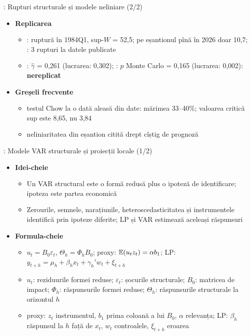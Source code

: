 \begin{frame}{: Rupturi structurale și modele neliniare (2/2)}
\itemsize{\small}
\begin{itemize}
    \item \textbf{Replicarea}
    \begin{itemize}
        \item {}: ruptură în 1984Q1, sup-$W$ = 52{,}5; pe eșantionul pînă în 2026 doar 10{,}7; : 3 rupturi la datele publicate
        \item {}: $\hat\gamma$ = 0{,}261 (lucrarea: 0{,}302); : $p$ Monte Carlo = 0{,}165 (lucrarea: 0{,}002): \textbf{nereplicat}
    \end{itemize}
    \item \textbf{Greșeli frecvente}
    \begin{itemize}
        \item testul Chow la o dată aleasă din date: mărimea 33--40\%; valoarea critică sup este 8{,}65, nu 3,84
        \item neliniaritatea din eșantion citită drept cîștig de prognoză
    \end{itemize}
\end{itemize}
\end{frame}

\begin{frame}{: Modele VAR structurale și proiecții locale (1/2)}
\itemsize{\footnotesize}
\begin{itemize}
    \item \textbf{Idei-cheie}
    \begin{itemize}
        \item Un VAR structural este o formă redusă plus o ipoteză de identificare; ipoteza este partea economică
        \item Zerourile, semnele, narațiunile, heteroscedasticitatea și instrumentele identifică prin ipoteze diferite; LP și VAR estimează aceleași răspunsuri
    \end{itemize}
    \item \textbf{Formula-cheie}
    \begin{itemize}
        \item $u_t = B_0\varepsilon_t$, $\Theta_h = \Phi_hB_0$; proxy: $\mathbb{E}(u_tz_t) = \alpha b_1$; LP: $y_{t+h} = \mu_h + \beta_hx_t + \gamma_h'w_t + \xi_{t+h}$
        \item $u_t$: reziduurile formei reduse; $\varepsilon_t$: șocurile structurale; $B_0$: matricea de impact; $\Phi_h$: răspunsurile formei reduse; $\Theta_h$: răspunsurile structurale la orizontul $h$
        \item proxy: $z_t$ instrumentul, $b_1$ prima coloană a lui $B_0$, $\alpha$ relevanța; LP: $\beta_h$ răspunsul la $h$ față de $x_t$, $w_t$ controalele, $\xi_{t+h}$ eroarea
    \end{itemize}
\end{itemize}
\end{frame}

